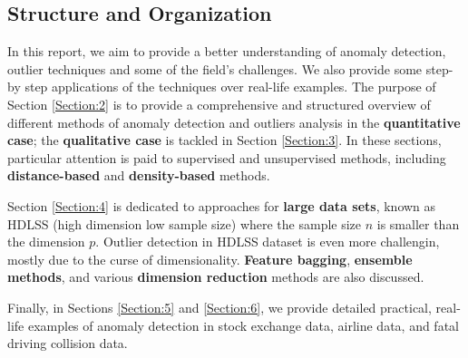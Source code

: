 \subsection{Structure and Organization}
In this report, we aim to provide a better understanding of anomaly detection, outlier techniques and some of the field's challenges. We also provide some step-by step applications of the techniques over real-life examples.
\newl The purpose of Section \ref{Section:2} is to provide a comprehensive and structured overview of different methods of anomaly detection and outliers analysis in the \textbf{quantitative case}; the \textbf{qualitative case} is tackled in Section \ref{Section:3}. In these sections, particular attention is paid to supervised and unsupervised methods, including \textbf{distance-based} and \textbf{density-based} methods. \par Section \ref{Section:4} is dedicated to approaches for \textbf{large data sets}, known as HDLSS (high dimension low sample size) where the sample size $n$ is smaller than the dimension $p$. Outlier detection in HDLSS dataset is even more challengin, mostly due to the curse of dimensionality. \textbf{Feature bagging}, \textbf{ensemble methods}, and various \textbf{dimension reduction} methods are also discussed. \par  Finally, in Sections \ref{Section:5} and \ref{Section:6}, we provide detailed practical, real-life examples of anomaly detection in stock exchange data, airline data, and fatal driving collision data.
